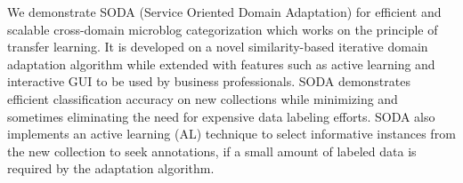 We demonstrate SODA (Service Oriented Domain Adaptation) for efficient and scalable cross-domain microblog categorization which works on the principle of transfer learning. It is developed on a novel similarity-based iterative domain adaptation algorithm while extended with features such as active learning and interactive GUI to be used by business professionals. SODA demonstrates efficient classification accuracy on new collections while minimizing and sometimes eliminating the need for expensive data labeling efforts. SODA also implements an active learning (AL) technique to select informative instances from the new collection to seek annotations, if a small amount of labeled data is required by the adaptation algorithm.
